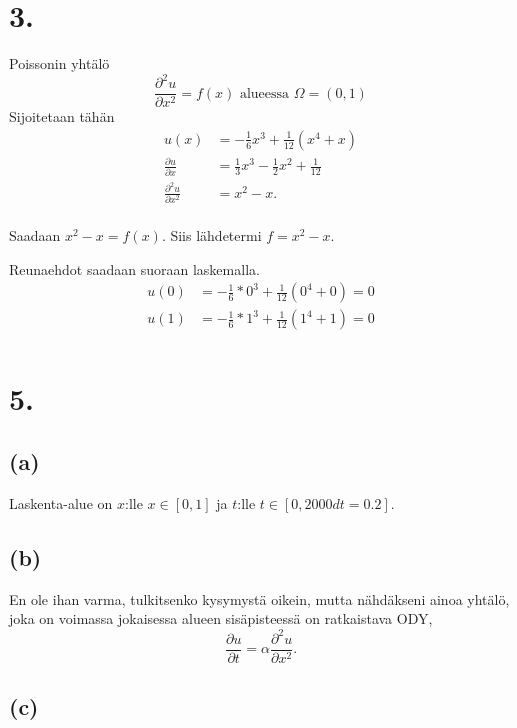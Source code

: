 \documentclass{article}
\title{}
\author{Mikael Myyrä}
\date{}
\begin{document}
\pagestyle{empty}

\section*{3.}

Poissonin yhtälö
\[
  \frac{\partial^2 u}{\partial x^2} = f(x) \text{ alueessa } \Omega = (0, 1)
\]
Sijoitetaan tähän
\begin{align*}
  u(x) &= -\frac{1}{6}x^3 + \frac{1}{12}(x^4 + x) \\
  \frac{\partial u}{\partial x} &= \frac{1}{3}x^3 - \frac{1}{2}x^2 + \frac{1}{12} \\
  \frac{\partial^2 u}{\partial x^2} &= x^2 - x. \\
\end{align*}

Saadaan $x^2 - x = f(x)$. Siis lähdetermi $f = x^2 - x$.

Reunaehdot saadaan suoraan laskemalla.
\begin{align*}
  u(0) &= -\frac{1}{6}*0^3 + \frac{1}{12}(0^4 + 0) = 0 \\
  u(1) &= -\frac{1}{6}*1^3 + \frac{1}{12}(1^4 + 1) = 0 \\
\end{align*}

\newpage

\section*{5.}

\subsection*{(a)}

Laskenta-alue on $x$:lle $x \in [0, 1]$
ja $t$:lle $t \in [0, 2000dt = 0.2]$.

\subsection*{(b)}

En ole ihan varma, tulkitsenko kysymystä oikein, mutta
nähdäkseni ainoa yhtälö, joka on voimassa jokai\-sessa alueen
sisäpisteessä on ratkaistava ODY,
\[
  \frac{\partial u}{\partial t} = \alpha \frac{\partial^2 u}{\partial x^2}.
\]

\subsection*{(c)}
\end{document}

